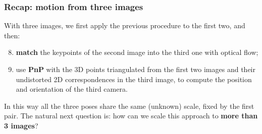 \subsubsection{Recap: motion from three images}
With three images, we first apply the previous procedure to the first two, and then:
\begin{enumerate}
    \setcounter{enumi}{7}
    \item \textbf{match} the keypoints of the second image into the third one with optical flow;
    \item use \textbf{PnP} with the 3D points triangulated from the first two images and their undistorted 2D correspondences in the third image, to compute the position and orientation of the third camera.
\end{enumerate}
In this way all the three poses share the same (unknown) scale, fixed by the first pair.
The natural next question is: how can we scale this approach to \textbf{more than 3 images}?
